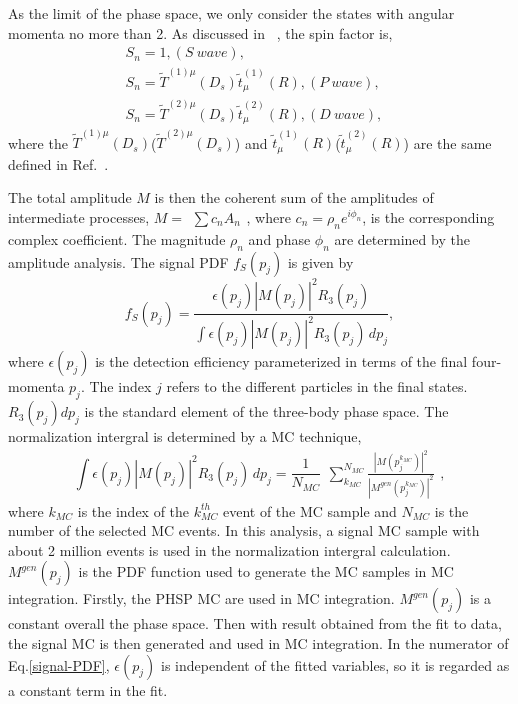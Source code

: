 {    As the limit of the phase space, we only consider the states with angular momenta no more than 2. As discussed in ~\cite{Doc-DB-613-v16}, the spin factor is, 
    \begin{equation}
        \begin{array}{lr}
            S_{n} = 1,           (S\ wave), &\\
            S_{n} = \tilde{T}^{(1)\mu}(D_{s})\tilde{t}^{(1)}_{\mu}(R),          (P\ wave), &\\
            S_{n} = \tilde{T}^{(2)\mu}(D_{s})\tilde{t}^{(2)}_{\mu}(R),          (D\ wave), &
        \end{array}\label{spin-factor} 
    \end{equation}
    where the $\tilde{T}^{(1)\mu}(D_{s})$($\tilde{T}^{(2)\mu}(D_{s})$) and $\tilde{t}^{(1)}_{\mu}(R)$($\tilde{t}^{(2)}_{\mu}(R)$) are the same defined in Ref.~\cite{covariant-tensors}.

The total amplitude $M$ is then the coherent sum of the amplitudes of intermediate processes, $M=\begin{matrix}\sum c_{n}A_{n}\end{matrix}$, where $c_{n}=\rho_{n}e^{i\phi_{n}}$, is the corresponding complex coefficient. The magnitude $\rho_{n}$ and phase $\phi_{n}$ are determined by the amplitude analysis. 
    The signal PDF $f_{S}(p_{j})$ is given by 
    \begin{equation}
        f_{S}(p_{j}) = \frac{\epsilon(p_{j})\left|M(p_{j})\right|^{2}R_{3}(p_{j})}{\int \epsilon(p_{j})\left|M(p_{j})\right|^{2}R_{3}(p_{j})\,dp_{j}}, \label{signal-PDF}
    \end{equation}
    where $\epsilon(p_{j})$ is the detection efficiency parameterized in terms of the final four-momenta $p_{j}$. The index $j$ refers to the different particles in the final states. $R_{3}(p_{j})dp_{j}$ is the standard element of the three-body phase space. The normalization intergral is determined by a MC technique,
    \begin{equation}
    \int \epsilon(p_{j})\left|M(p_{j})\right|^{2}R_{3}(p_{j})\,dp_{j}= \frac{1}{N_{MC}} \begin{matrix}\sum_{k_{MC}}^{N_{MC}} \frac{\left|M(p_{j}^{k_{MC}})\right|^{2}}{\left|M^{gen}(p_{j}^{k_{MC}})\right|^{2}}\end{matrix}, \label{MC-intergral}
    \end{equation}
    where $k_{MC}$ is the index of the $k_{MC}^{th}$ event of the MC sample and $N_{MC}$ is the number of the selected MC events. In this analysis, a signal MC sample with about 2 million events is used in the normalization intergral calculation. $M^{gen}(p_{j})$ is the PDF function used to generate the MC samples in MC integration.
    Firstly, the PHSP MC are used in MC integration. $M^{gen}(p_{j})$ is a constant overall the phase space. Then with result obtained from the fit to data, the signal MC is then generated and used in MC integration. In the numerator of Eq.\ref{signal-PDF}, $\epsilon(p_{j})$ is independent of the fitted variables, so it is regarded as a constant term in the fit.

}
